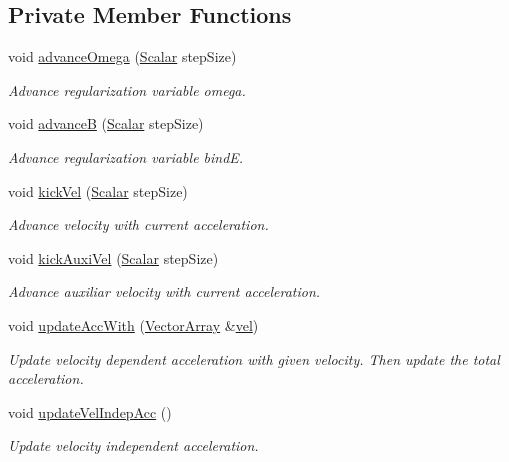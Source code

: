\subsection*{Private Member Functions}
\begin{DoxyCompactItemize}
\item 
void \mbox{\hyperlink{classregu_system_ad04ed572a5718219d506af6cd924a395}{advance\+Omega}} (\mbox{\hyperlink{classregu_system_aca8ee2c387943164ee3ea68370fc3ac0}{Scalar}} step\+Size)
\begin{DoxyCompactList}\small\item\em Advance regularization variable omega. \end{DoxyCompactList}\item 
void \mbox{\hyperlink{classregu_system_a0a74b00e0e5124a27d0dc90b969f83cc}{advanceB}} (\mbox{\hyperlink{classregu_system_aca8ee2c387943164ee3ea68370fc3ac0}{Scalar}} step\+Size)
\begin{DoxyCompactList}\small\item\em Advance regularization variable bindE. \end{DoxyCompactList}\item 
void \mbox{\hyperlink{classregu_system_a16cf42c1efb79a8ed5f9fecad7ad13dc}{kick\+Vel}} (\mbox{\hyperlink{classregu_system_aca8ee2c387943164ee3ea68370fc3ac0}{Scalar}} step\+Size)
\begin{DoxyCompactList}\small\item\em Advance velocity with current acceleration. \end{DoxyCompactList}\item 
void \mbox{\hyperlink{classregu_system_a53e1d725a1df2b65029f622a17364b1e}{kick\+Auxi\+Vel}} (\mbox{\hyperlink{classregu_system_aca8ee2c387943164ee3ea68370fc3ac0}{Scalar}} step\+Size)
\begin{DoxyCompactList}\small\item\em Advance auxiliar velocity with current acceleration. \end{DoxyCompactList}\item 
void \mbox{\hyperlink{classregu_system_a5928c1085fa45b17bfd0da8661819852}{update\+Acc\+With}} (\mbox{\hyperlink{classregu_system_aa4ecefb5c437230b994171e231450be8}{Vector\+Array}} \&\mbox{\hyperlink{classparticle_system_a545da170c4d59f18c6ddb18817cb5f3e}{vel}})
\begin{DoxyCompactList}\small\item\em Update velocity dependent acceleration with given velocity. Then update the total acceleration. \end{DoxyCompactList}\item 
void \mbox{\hyperlink{classregu_system_a9ef1a5d582d3764adf3f3f35e5fac431}{update\+Vel\+Indep\+Acc}} ()
\begin{DoxyCompactList}\small\item\em Update velocity independent acceleration. \end{DoxyCompactList}\end{DoxyCompactItemize}
